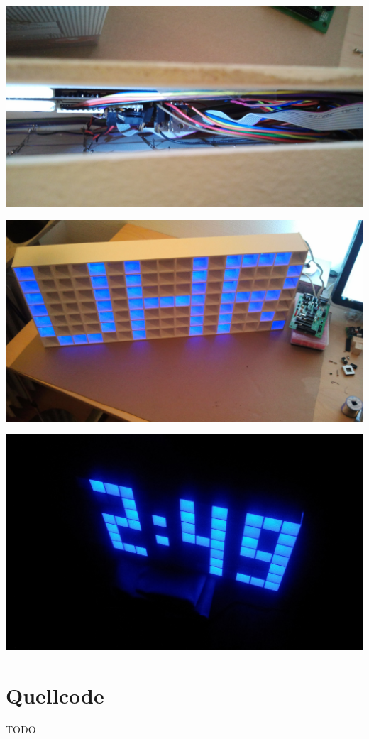 %
\newpage
\centerline{\includegraphics[width=\linewidth]{images/gehaeuse7.jpg}}
\label{fig_gehaeuse7}
\vfill
\centerline{\includegraphics[width=\linewidth]{images/gehaeuse8.jpg}}
\label{fig_gehaeuse8}
%
\newpage
\centerline{\includegraphics[width=\linewidth]{images/gehaeuse9.jpg}}
\label{fig_gehaeuse9}
\vfill

\newpage
\section{Quellcode}
TODO